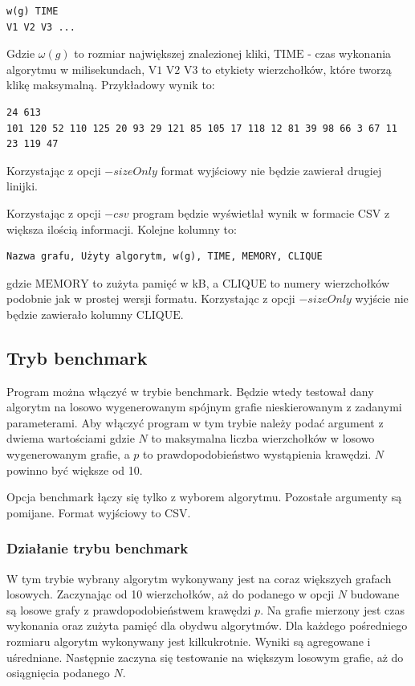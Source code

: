 \documentclass[12pt, a4paper]{article}
\begin{document}
\begin{verbatim}
w(g) TIME
V1 V2 V3 ...
\end{verbatim}
Gdzie $\omega(g)$ to rozmiar największej znalezionej kliki, $\text{TIME}$ - czas wykonania algorytmu w milisekundach, $\text{V1 V2 V3}$ to etykiety wierzchołków, które tworzą klikę maksymalną. Przykładowy wynik to:

\begin{verbatim}
24 613
101 120 52 110 125 20 93 29 121 85 105 17 118 12 81 39 98 66 3 67 11 23 119 47
\end{verbatim}

Korzystając z opcji $-sizeOnly$ format wyjściowy nie będzie zawierał drugiej linijki. 

Korzystając z opcji $-csv$ program będzie wyświetlał wynik w formacie CSV z większa ilością informacji. Kolejne kolumny to:
\begin{verbatim}
Nazwa grafu, Użyty algorytm, w(g), TIME, MEMORY, CLIQUE
\end{verbatim}

gdzie $\text{MEMORY}$ to zużyta pamięć w kB, a $\text{CLIQUE}$ to numery wierzchołków podobnie jak w prostej wersji formatu. Korzystając z opcji $-sizeOnly$ wyjście nie będzie zawierało kolumny $\text{CLIQUE}$.

\subsection{Tryb benchmark}
Program można włączyć w trybie benchmark. Będzie wtedy testował dany algorytm na losowo wygenerowanym spójnym grafie nieskierowanym z zadanymi parameterami. Aby włączyć program w tym trybie należy podać argument z dwiema wartościami \emph{} gdzie $N$ to maksymalna liczba wierzchołków w losowo wygenerowanym grafie, a $p$ to prawdopodobieństwo wystąpienia krawędzi. $N$ powinno być większe od 10.

Opcja benchmark łączy się tylko z wyborem algorytmu. Pozostałe argumenty są pomijane. Format wyjściowy to CSV.

\subsubsection{Działanie trybu benchmark}
W tym trybie wybrany algorytm wykonywany jest na coraz większych grafach losowych. Zaczynając od 10 wierzchołków, aż do podanego w opcji $N$ budowane są losowe grafy z prawdopodobieństwem krawędzi $p$. Na grafie mierzony jest czas wykonania oraz zużyta pamięć dla obydwu algorytmów. Dla każdego pośredniego rozmiaru algorytm wykonywany jest kilkukrotnie. Wyniki są agregowane i uśredniane. Następnie zaczyna się testowanie na większym losowym grafie, aż do osiągnięcia podanego $N$.
\end{document}
